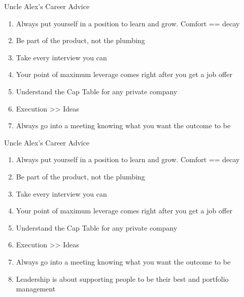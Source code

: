 \documentclass[nobackground,dvipsnames,table,aspectratio=169]{beamer}
\begin{document}
\begin{frame}{Uncle Alex's Career Advice}
    \begin{enumerate}
        \item Always put yourself in a position to learn and grow. Comfort == decay
        \item Be part of the product, not the plumbing
        \item Take every interview you can
        \item Your point of maximum leverage comes right after you get a job offer
        \item Understand the Cap Table for any private company
        \item Execution >> Ideas
        \item Always go into a meeting knowing what you want the outcome to be
    \end{enumerate}
\end{frame}

\begin{frame}{Uncle Alex's Career Advice}
    \begin{enumerate}
        \item Always put yourself in a position to learn and grow. Comfort == decay
        \item Be part of the product, not the plumbing
        \item Take every interview you can
        \item Your point of maximum leverage comes right after you get a job offer
        \item Understand the Cap Table for any private company
        \item Execution >> Ideas
        \item Always go into a meeting knowing what you want the outcome to be
        \item Leadership is about supporting people to be their best and portfolio management
    \end{enumerate}
\end{frame}
\end{document}
